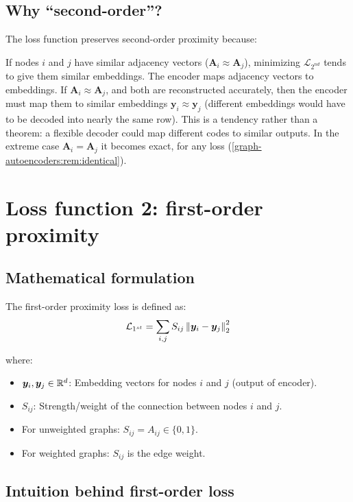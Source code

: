 \begin{notechapter}
\subsection{Why ``second-order''?}

The loss function preserves second-order proximity because:

\begin{intuition}
If nodes $i$ and $j$ have similar adjacency vectors ($\bm{A}_i \approx \bm{A}_j$), minimizing $\mathcal{L}_{2^{nd}}$ tends to give them similar embeddings.
The encoder maps adjacency vectors to embeddings. If $\bm{A}_i \approx \bm{A}_j$, and both are reconstructed accurately, then the encoder must map them to similar embeddings $\bm{y}_i \approx \bm{y}_j$ (different embeddings would have to be decoded into nearly the same row). This is a tendency rather than a theorem: a flexible decoder could map different codes to similar outputs. In the extreme case $\bm A_i = \bm A_j$ it becomes exact, for any loss (\cref{graph-autoencoders:rem:identical}).
\end{intuition}

\section{Loss function 2: first-order proximity}

\subsection{Mathematical formulation}

The first-order proximity loss is defined as:
\begin{equation}
\mathcal{L}_{1^{st}} = \sum_{i,j} S_{ij} \left\|\bm{y}_i - \bm{y}_j\right\|^2_2
\label{graph-autoencoders:eq:l1_loss}
\end{equation}

where:
\begin{itemize}
    \item $\bm{y}_i, \bm{y}_j \in \mathbb{R}^d$: Embedding vectors for nodes $i$ and $j$ (output of encoder).
    \item $S_{ij}$: Strength/weight of the connection between nodes $i$ and $j$.
    \item For unweighted graphs: $S_{ij} = A_{ij} \in \{0, 1\}$.
    \item For weighted graphs: $S_{ij}$ is the edge weight.
\end{itemize}

\subsection{Intuition behind first-order loss}


\end{notechapter}

